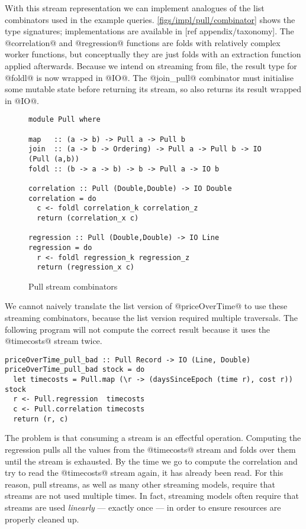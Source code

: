 With this stream representation we can implement analogues of the list combinators used in the example queries.
\autoref{figs/impl/pull/combinator} shows the type signatures; implementations are available in [ref appendix/taxonomy].
The @correlation@ and @regression@ functions are folds with relatively complex worker functions, but conceptually they are just folds with an extraction function applied afterwards.
Because we intend on streaming from file, the result type for @foldl@ is now wrapped in @IO@.
The @join_pull@ combinator must initialise some mutable state before returning its stream, so also returns its result wrapped in @IO@.

\begin{figure}
\begin{lstlisting}
module Pull where

map   :: (a -> b) -> Pull a -> Pull b
join  :: (a -> b -> Ordering) -> Pull a -> Pull b -> IO (Pull (a,b))
foldl :: (b -> a -> b) -> b -> Pull a -> IO b

correlation :: Pull (Double,Double) -> IO Double
correlation = do
  c <- foldl correlation_k correlation_z
  return (correlation_x c)

regression :: Pull (Double,Double) -> IO Line
regression = do
  r <- foldl regression_k regression_z
  return (regression_x c)
\end{lstlisting}
\caption{Pull stream combinators}
\label{figs/impl/pull/combinator}
\end{figure}

We cannot naively translate the list version of @priceOverTime@ to use these streaming combinators, because the list version required multiple traversals.
The following program will not compute the correct result because it uses the @timecosts@ stream twice.

\begin{lstlisting}
priceOverTime_pull_bad :: Pull Record -> IO (Line, Double)
priceOverTime_pull_bad stock = do
  let timecosts = Pull.map (\r -> (daysSinceEpoch (time r), cost r)) stock
  r <- Pull.regression  timecosts
  c <- Pull.correlation timecosts
  return (r, c)
\end{lstlisting}

The problem is that consuming a stream is an effectful operation.
Computing the regression pulls all the values from the @timecosts@ stream and folds over them until the stream is exhausted.
By the time we go to compute the correlation and try to read the @timecosts@ stream again, it has already been read.
For this reason, pull streams, as well as many other streaming models, require that streams are not used multiple times.
In fact, streaming models often require that streams are used \emph{linearly} --- exactly once --- in order to ensure resources are properly cleaned up.

